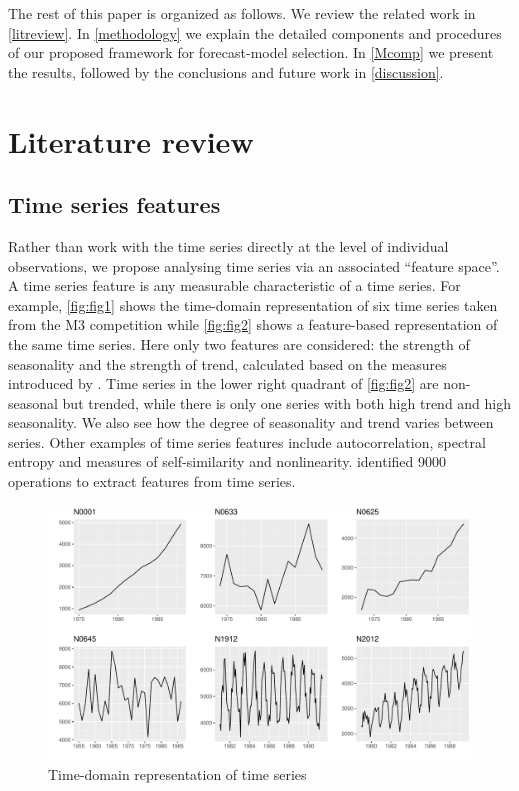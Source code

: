 \documentclass[11pt,a4paper,]{article}
\begin{document}
The rest of this paper is organized as follows. We review the related work in \autoref{litreview}. In \autoref{methodology} we explain the detailed components and procedures of our proposed framework for forecast-model selection. In \autoref{Mcomp} we present the results, followed by the conclusions and future work in \autoref{discussion}.

\hypertarget{litreview}{%
\section{Literature review}\label{litreview}}

\hypertarget{time-series-features}{%
\subsection{Time series features}\label{time-series-features}}

Rather than work with the time series directly at the level of individual observations, we propose analysing time series via an associated ``feature space''. A time series feature is any measurable characteristic of a time series. For example, \autoref{fig:fig1} shows the time-domain representation of six time series taken from the M3 competition \autocite{makridakis2000m3} while \autoref{fig:fig2} shows a feature-based representation of the same time series. Here only two features are considered: the strength of seasonality and the strength of trend, calculated based on the measures introduced by \textcite{wang2009rule}. Time series in the lower right quadrant of \autoref{fig:fig2} are non-seasonal but trended, while there is only one series with both high trend and high seasonality. We also see how the degree of seasonality and trend varies between series. Other examples of time series features include autocorrelation, spectral entropy and measures of self-similarity and nonlinearity. \textcite{fulcher2014highly} identified 9000 operations to extract features from time series.

\begin{figure}

{\centering \includegraphics[width=\textwidth]{figure/fig1-1} 

}

\caption{Time-domain representation of time series}\label{fig:fig1}
\end{figure}
\end{document}
